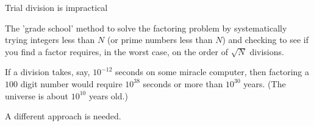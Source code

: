 \documentclass{beamer}
\begin{document}
\begin{frame}{Trial division is impractical}
	
\begin{block}{}
	The 'grade school' method to solve the factoring problem by systematically trying integers less than $N$ (or prime numbers less than $N$)
	and checking to see if you find a factor requires, in the worst case, on the order of $\sqrt{N}$ divisions.  
\end{block}
\begin{block}{}
	If a division takes, say, $10^{-12}$ seconds on some miracle computer, then factoring a $100$ digit number would require
	$10^{38}$ seconds or more than $10^{30}$ years.  (The universe is about $10^{10}$ years old.)
\end{block}
\begin{block}{}
	A different approach is needed.
\end{block}
\end{frame}
\end{document}
